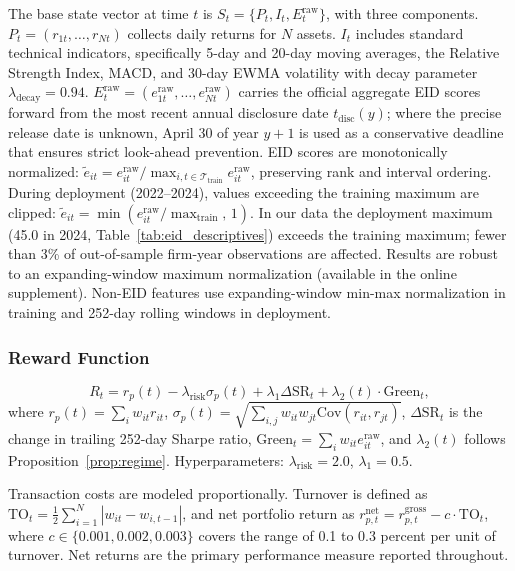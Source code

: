 \documentclass[12pt]{article}
\begin{document}
The base state vector at time $t$ is $S_t=\{P_t, I_t, E_t^{\mathrm{raw}}\}$, with three components. $P_t=(r_{1t},\ldots,r_{Nt})$ collects daily returns for $N$ assets. $I_t$ includes standard technical indicators, specifically 5-day and 20-day moving averages, the Relative Strength Index, MACD, and 30-day EWMA volatility with decay parameter $\lambda_{\mathrm{decay}}=0.94$. $E_t^{\mathrm{raw}}=(e_{1t}^{\mathrm{raw}},\ldots,e_{Nt}^{\mathrm{raw}})$ carries the official aggregate EID scores forward from the most recent annual disclosure date $t_{\mathrm{disc}}(y)$; where the precise release date is unknown, April 30 of year $y+1$ is used as a conservative deadline that ensures strict look-ahead prevention.
EID scores are monotonically normalized:
$\tilde{e}_{it}=e_{it}^{\mathrm{raw}}/\max_{i,t\in\mathcal{T}_{\mathrm{train}}}e_{it}^{\mathrm{raw}}$,
preserving rank and interval ordering. During deployment (2022--2024),
values exceeding the training maximum are clipped:
$\tilde{e}_{it}=\min(e_{it}^{\mathrm{raw}}/\max_{\mathrm{train}},\,1)$.
In our data the deployment maximum (45.0 in 2024, Table~\ref{tab:eid_descriptives})
exceeds the training maximum; fewer than 3\% of out-of-sample firm-year
observations are affected. Results are robust to an expanding-window
maximum normalization (available in the online supplement). Non-EID
features use expanding-window min-max normalization in training and
252-day rolling windows in deployment.

\subsubsection{Reward Function}

\begin{equation}
  R_t = r_p(t) - \lambda_{\mathrm{risk}}\sigma_p(t)
      + \lambda_1\Delta\mathrm{SR}_t
      + \lambda_2(t)\cdot\mathrm{Green}_t,
  \label{eq:reward}
\end{equation}
where $r_p(t)=\sum_i w_{it}r_{it}$,
$\sigma_p(t)=\sqrt{\sum_{i,j}w_{it}w_{jt}\mathrm{Cov}(r_{it},r_{jt})}$,
$\Delta\mathrm{SR}_t$ is the change in trailing 252-day Sharpe ratio,
$\mathrm{Green}_t=\sum_i w_{it}e_{it}^{\mathrm{raw}}$, and
$\lambda_2(t)$ follows Proposition~\ref{prop:regime}.
Hyperparameters: $\lambda_{\mathrm{risk}}=2.0$, $\lambda_1=0.5$.

Transaction costs are modeled proportionally. Turnover is defined as $\mathrm{TO}_t = \tfrac{1}{2}\sum_{i=1}^N|w_{it}-w_{i,t-1}|$, and net portfolio return as $r_{p,t}^{\mathrm{net}} = r_{p,t}^{\mathrm{gross}} - c\cdot\mathrm{TO}_t$, where $c\in\{0.001,0.002,0.003\}$ covers the range of 0.1 to 0.3 percent per unit of turnover. Net returns are the primary performance measure reported throughout.
\end{document}
